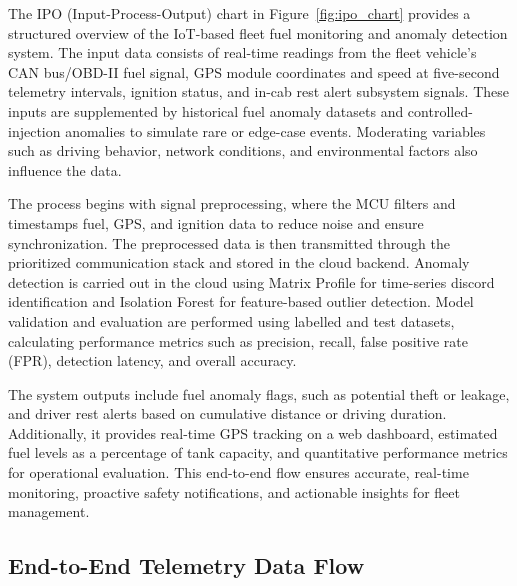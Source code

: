 The IPO (Input-Process-Output) chart in Figure~\ref{fig:ipo_chart} provides a structured overview of the IoT-based fleet fuel monitoring and anomaly detection system. The input data consists of real-time readings from the fleet vehicle's CAN bus/OBD-II fuel signal, GPS module coordinates and speed at five-second telemetry intervals, ignition status, and in-cab rest alert subsystem signals. These inputs are supplemented by historical fuel anomaly datasets and controlled-injection anomalies to simulate rare or edge-case events. Moderating variables such as driving behavior, network conditions, and environmental factors also influence the data.

The process begins with signal preprocessing, where the MCU filters and timestamps fuel, GPS, and ignition data to reduce noise and ensure synchronization. The preprocessed data is then transmitted through the prioritized communication stack and stored in the cloud backend. Anomaly detection is carried out in the cloud using Matrix Profile for time-series discord identification and Isolation Forest for feature-based outlier detection. Model validation and evaluation are performed using labelled and test datasets, calculating performance metrics such as precision, recall, false positive rate (FPR), detection latency, and overall accuracy.

The system outputs include fuel anomaly flags, such as potential theft or leakage, and driver rest alerts based on cumulative distance or driving duration. Additionally, it provides real-time GPS tracking on a web dashboard, estimated fuel levels as a percentage of tank capacity, and quantitative performance metrics for operational evaluation. This end-to-end flow ensures accurate, real-time monitoring, proactive safety notifications, and actionable insights for fleet management.

\subsection{End-to-End Telemetry Data Flow}

